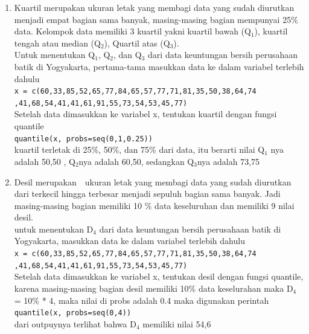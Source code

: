 \documentclass[a4paper,12pt]{article}
\begin{document}
\begin{enumerate}[label=\alph*.]
	\item Kuartil merupakan ukuran letak yang membagi data yang sudah diurutkan menjadi empat bagian sama banyak, masing-masing bagian mempunyai 25\% data.
	Kelompok data memiliki 3 kuartil yakni kuartil bawah (Q$_{1}$), kuartil tengah atau median (Q$_{2}$), Quartil atas (Q$_{3}$). 
	\\Untuk menentukan Q$_{1}$, Q$_{2}$, dan Q$_{3}$ dari data keuntungan bersih perusahaan batik di Yogyakarta, pertama-tama masukkan data ke dalam variabel terlebih dahulu\\
	\texttt{x = c(60,33,85,52,65,77,84,65,57,77,71,81,35,50,38,64,74\\,41,68,54,41,41,61,91,55,73,54,53,45,77)\\}
	Setelah data dimasukkan ke variabel x, tentukan kuartil dengan fungsi quantile\\
	\texttt{quantile(x, probs=seq(0,1,0.25))\\}
	kuartil terletak di 25\%, 50\%, dan 75\% dari data, itu berarti nilai Q$_{1}$ nya adalah 50,50 , Q$_{2}$nya adalah 60,50, sedangkan Q$_{3}$nya adalah 73,75
	
	\item Desil merupakan  ukuran letak yang membagi data yang sudah diurutkan dari terkecil hingga terbesar menjadi sepuluh bagian sama banyak. Jadi masing-masing bagian memiliki 10 \% data keseluruhan dan memiliki 9 nilai desil.\\
	untuk menentukan D$_{4}$ dari data keuntungan bersih perusahaan batik di Yogyakarta, masukkan data ke dalam variabel terlebih dahulu\\
	\texttt{x = c(60,33,85,52,65,77,84,65,57,77,71,81,35,50,38,64,74\\,41,68,54,41,41,61,91,55,73,54,53,45,77)\\}
	Setelah data dimasukkan ke variabel x, tentukan desil dengan fungsi quantile, karena masing-masing bagian desil memiliki 10\% data keselurahan maka D$_{4}$ = 10\% * 4, maka nilai di probs adalah 0.4 maka digunakan perintah\\
	\texttt{quantile(x, probs=seq(0,4))\\}
	dari outpuynya terlihat bahwa D$_{4}$ memiliki nilai 54,6
	

\end{enumerate}
\end{document}
